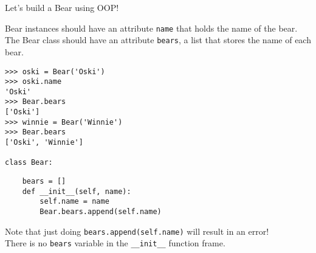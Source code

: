 \begin{blocksection}
\question Let's build a Bear using OOP!

Bear instances should have an attribute \lstinline{name} that holds the name of the bear.
The Bear class should have an attribute \lstinline{bears}, a list that stores the name of each bear.
\vspace{1\baselineskip}
\begin{lstlisting}
>>> oski = Bear('Oski')
>>> oski.name
'Oski'
>>> Bear.bears
['Oski']
>>> winnie = Bear('Winnie')
>>> Bear.bears
['Oski', 'Winnie']

class Bear:
\end{lstlisting}

\begin{nonsol}
\vspace{4\baselineskip}
\end{nonsol}

\begin{solution}
  \vspace{-0.5\baselineskip}
\begin{lstlisting}
    bears = []
    def __init__(self, name):
        self.name = name
        Bear.bears.append(self.name)
\end{lstlisting}

Note that just doing \lstinline{bears.append(self.name)} will result in an error!
\\There is no \lstinline{bears} variable in the \lstinline{__init__} function frame.
\end{solution}
\end{blocksection}